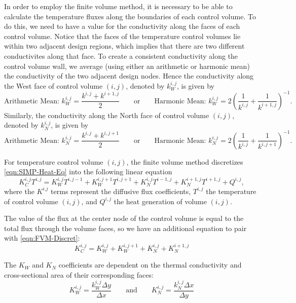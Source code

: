 In order to employ the finite volume method, it is necessary to be able to calculate the temperature fluxes along the boundaries of each control volume. To do this, we need to have a value for the conductivity along the faces of each control volume. Notice that the faces of the temperature control volumes lie within two adjacent design regions, which implies that there are two different conductivites along that face. To create a consistent conductivity along the control volume wall, we average (using either an arithmetic or harmonic mean) the conductivity of the two adjacent design nodes. Hence the conductivity along the West face of control volume $(i,j)$, denoted by $k^{i,j}_W$, is given by
\begin{equation}
	\text{Arithmetic Mean: }k^{i,j}_W=\frac{k^{i,j}+k^{i+1,j}}{2}\qquad\text{or}\qquad\text{Harmonic Mean: }k^{i,j}_W=2\left(\frac{1}{k^{i,j}}+\frac{1}{k^{i+1,j}}\right)^{-1}.\label{eqn:k_W-Average-Filter}
\end{equation}
Similarly, the conductivity along the North face of control volume $(i,j)$, denoted by $k^{i,j}_N$, is given by
\begin{equation}
	\text{Arithmetic Mean: }k^{i,j}_N=\frac{k^{i,j}+k^{i,j+1}}{2}\qquad\text{or}\qquad\text{Harmonic Mean: }k^{i,j}_N=2\left(\frac{1}{k^{i,j}}+\frac{1}{k^{i,j+1}}\right)^{-1}.\label{eqn:k_N-Average-Filter}
\end{equation}

For temperature control volume $(i,j)$, the finite volume method discretizes \eqref{eqn:SIMP-Heat-Eq} into the following linear equation
\begin{equation}
	K^{i,j}_C T^{i,j}=K_W^{i,j}T^{i,j-1}+K_W^{i,j+1}T^{i,j+1}+K_N^{i,j}T^{i-1,j}+K_N^{i+1,j}T^{i+1,j}+Q^{i,j},\label{eqn:FVM-Discret}
\end{equation}
where the $K^{i.j}$ terms represent the diffusive flux coefficients, $T^{i,j}$ the temperature of control volume $(i,j)$, and $Q^{i,j}$ the heat generation of volume $(i,j)$.

The value of the flux at the center node of the control volume is equal to the total flux through the volume faces, so we have an additional equation to pair with \eqref{eqn:FVM-Discret}:
\begin{equation}
	K^{i,j}_C=K_W^{i,j}+K_W^{i,j+1}+K_N^{i,j}+K_N^{i+1,j}\label{eqn:CenterFluxCoeff}
\end{equation}

The $K_W$ and $K_N$ coefficients are dependent on the thermal conductivity and cross-sectional area of their corresponding faces:
\begin{equation}
	K_W^{i,j}=\frac{k_W^{i,j}\Delta y}{\Delta x}\qquad\text{and}\qquad K_N^{i,j}=\frac{k_N^{i,j}\Delta x}{\Delta y}\label{eqn:K-Coeffs}
\end{equation}

